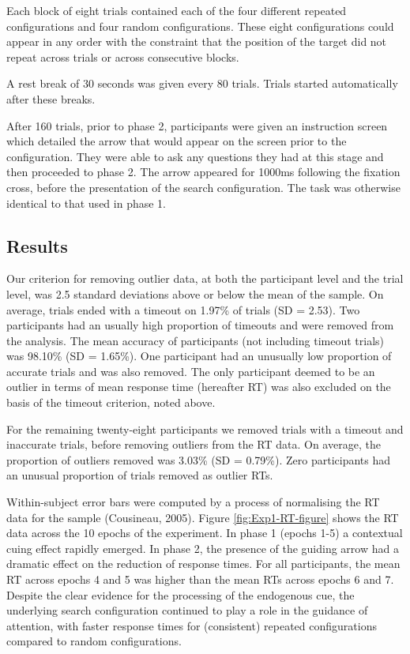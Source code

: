 \documentclass[
  man,floatsintext]{apa7}
\begin{document}
Each block of eight trials contained each of the four different repeated configurations and four random configurations. These eight configurations could appear in any order with the constraint that the position of the target did not repeat across trials or across consecutive blocks.

A rest break of 30 seconds was given every 80 trials. Trials started automatically after these breaks.

After 160 trials, prior to phase 2, participants were given an instruction screen which detailed the arrow that would appear on the screen prior to the configuration. They were able to ask any questions they had at this stage and then proceeded to phase 2. The arrow appeared for 1000ms following the fixation cross, before the presentation of the search configuration. The task was otherwise identical to that used in phase 1.

\hypertarget{results}{%
\subsection{Results}\label{results}}

Our criterion for removing outlier data, at both the participant level and the trial level, was 2.5 standard deviations above or below the mean of the sample. On average, trials ended with a timeout on 1.97\% of trials (SD = 2.53). Two participants had an usually high proportion of timeouts and were removed from the analysis. The mean accuracy of participants (not including timeout trials) was 98.10\% (SD = 1.65\%). One participant had an unusually low proportion of accurate trials and was also removed. The only participant deemed to be an outlier in terms of mean response time (hereafter RT) was also excluded on the basis of the timeout criterion, noted above.

For the remaining twenty-eight participants we removed trials with a timeout and inaccurate trials, before removing outliers from the RT data. On average, the proportion of outliers removed was 3.03\% (SD = 0.79\%). Zero participants had an unusual proportion of trials removed as outlier RTs.



Within-subject error bars were computed by a process of normalising the RT data for the sample (Cousineau, 2005). Figure \ref{fig:Exp1-RT-figure} shows the RT data across the 10 epochs of the experiment. In phase 1 (epochs 1-5) a contextual cuing effect rapidly emerged. In phase 2, the presence of the guiding arrow had a dramatic effect on the reduction of response times. For all participants, the mean RT across epochs 4 and 5 was higher than the mean RTs across epochs 6 and 7. Despite the clear evidence for the processing of the endogenous cue, the underlying search configuration continued to play a role in the guidance of attention, with faster response times for (consistent) repeated configurations compared to random configurations.
\end{document}
